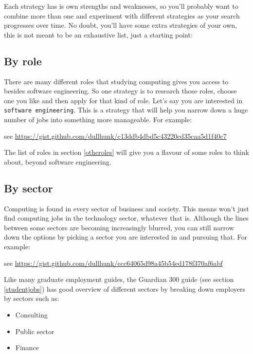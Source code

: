 \documentclass[
]{book}
\providecommand{\tightlist}{%
  \setlength{\itemsep}{0pt}\setlength{\parskip}{0pt}}
\begin{document}
Each strategy has is own strengths and weaknesses, so you'll probably want to combine more than one and experiment with different strategies as your search progresses over time. No doubt, you'll have some extra strategies of your own, this is not meant to be an exhaustive list, just a starting point:

\hypertarget{by-role}{%
\subsection{By role}\label{by-role}}

There are many different roles that studying computing gives you access to besides software engineering. So one strategy is to research those roles, choose one you like and then apply for that kind of role. Let's say you are interested in \texttt{software\ engineering}. This is a strategy that will help you narrow down a huge number of jobs into something more manageable. For example:

see \url{https://gist.github.com/dullhunk/c13ddb4dbd5c43220cd35caa5d1f40c7}

The list of roles in section \ref{otheroles} will give you a flavour of some roles to think about, beyond software engineering.

\hypertarget{by-sector}{%
\subsection{By sector}\label{by-sector}}

Computing is found in every sector of business and society. This means won't just find computing jobs in the technology sector, whatever that is. Although the lines between some sectors are becoming increasingly blurred, you can still narrow down the options by picking a sector you are interested in and pursuing that. For example:

see \url{https://gist.github.com/dullhunk/ecc64065d98a45b54ed178f370af6abf}

Like many graduate employment guides, the Guardian 300 guide (see section \ref{studentjobs}) has good overview of different sectors by breaking down employers by sectors such as:

\begin{itemize}
\tightlist
\item
  Consulting
\item
  Public sector
\item
  Finance
\end{itemize}
\end{document}
